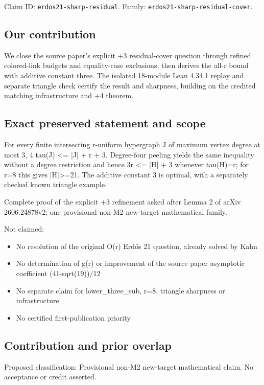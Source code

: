 \documentclass[11pt,a4paper]{article}
\begin{document}
Claim ID: \texttt{erdos21-sharp-residual}. Family: \texttt{erdos21-sharp-residual-cover}.

\subsection{Our contribution}
We close the source paper's explicit +3 residual-cover question through refined colored-link budgets and equality-case exclusions, then derives the all-r bound with additive constant three. The isolated 18-module Lean 4.34.1 replay and separate triangle check certify the result and sharpness, building on the credited matching infrastructure and +4 theorem.

\subsection{Exact preserved statement and scope}
For every finite intersecting r-uniform hypergraph J of maximum vertex degree at most 3, 4 tau(J) <= |J| + r + 3. Degree-four peeling yields the same inequality without a degree restriction and hence 3r <= |H| + 3 whenever tau(H)=r; for r=8 this gives |H|>=21. The additive constant 3 is optimal, with a separately checked known triangle example.

Complete proof of the explicit +3 refinement asked after Lemma 2 of arXiv 2606.24878v2; one provisional non-M2 new-target mathematical family.

Not claimed:

\begin{itemize}
\item No resolution of the original O(r) Erdős 21 question, already solved by Kahn
\end{itemize}
\begin{itemize}
\item No determination of g(r) or improvement of the source paper asymptotic coefficient (41-sqrt(19))/12
\end{itemize}
\begin{itemize}
\item No separate claim for lower\_three\_sub, r=8, triangle sharpness or infrastructure
\end{itemize}
\begin{itemize}
\item No certified first-publication priority
\end{itemize}
\subsection{Contribution and prior overlap}
Proposed classification: Provisional non-M2 new-target mathematical claim. No acceptance or credit asserted.
\end{document}
